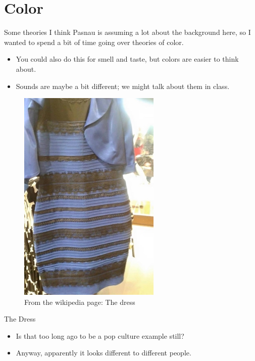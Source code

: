 \documentclass[
  17pt,
  letterpaper,
  ignorenonframetext,
  aspectratio=169,
]{beamer}
\providecommand{\tightlist}{%
  \setlength{\itemsep}{0pt}\setlength{\parskip}{0pt}}\usepackage{longtable,booktabs,array}
\begin{document}
\hypertarget{color-2}{%
\section{Color}\label{color-2}}

\begin{frame}{Some theories}
\protect\hypertarget{some-theories}{}
I think Pasnau is assuming a lot about the background here, so I wanted
to spend a bit of time going over theories of color.

\begin{itemize}[<+->]
\tightlist
\item
  You could also do this for smell and taste, but colors are easier to
  think about.
\item
  Sounds are maybe a bit different; we might talk about them in class.
\end{itemize}
\end{frame}

\begin{frame}
\begin{figure}

{\centering \includegraphics{../images/the_dress.jpg}

}

\caption{From the wikipedia page: The dress}

\end{figure}
\end{frame}

\begin{frame}{The Dress}
\protect\hypertarget{the-dress}{}
\begin{itemize}[<+->]
\tightlist
\item
  Is that too long ago to be a pop culture example still?
\item
  Anyway, apparently it looks different to different people.
\end{itemize}
\end{frame}
\end{document}
